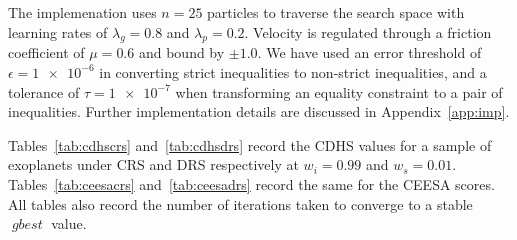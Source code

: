 \documentclass[10pt]{article}
\DeclareMathOperator*{\gbest}{\mathit{gbest}}
\begin{document}
The implemenation uses $n=25$ particles to traverse the search space with learning rates of $\lambda_g=0.8$ and
$\lambda_p=0.2$. Velocity is regulated through a friction coefficient of $\mu=0.6$ and bound by $\pm1.0$. We have used
an error threshold of $\epsilon=\num{1e-6}$ in converting strict inequalities to non-strict inequalities, and a
tolerance of $\tau=\num{1e-7}$ when transforming an equality constraint to a pair of inequalities. Further
implementation details are discussed in Appendix~\ref{app:imp}.

Tables~\ref{tab:cdhscrs} and~\ref{tab:cdhsdrs} record the CDHS values for a sample of exoplanets under CRS and DRS
respectively at $w_i=0.99$ and $w_s=0.01$. Tables~\ref{tab:ceesacrs} and~\ref{tab:ceesadrs} record the same for the
CEESA scores. All tables also record the number of iterations taken to converge to a stable $\gbest$ value.
\end{document}
